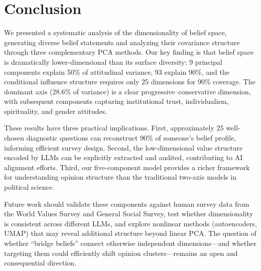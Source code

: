 \section{Conclusion}
\label{sec:conclusion}

We presented a systematic analysis of the dimensionality of belief space, generating \nbeliefs diverse belief statements and analyzing their covariance structure through three complementary PCA methods. Our key finding is that belief space is dramatically lower-dimensional than its surface diversity: 9 principal components explain 50\% of attitudinal variance, 93 explain 90\%, and the conditional influence structure requires only 25 dimensions for 90\% coverage. The dominant axis (28.6\% of variance) is a clear progressive--conservative dimension, with subsequent components capturing institutional trust, individualism, spirituality, and gender attitudes.

These results have three practical implications. First, approximately 25 well-chosen diagnostic questions can reconstruct 90\% of someone's belief profile, informing efficient survey design. Second, the low-dimensional value structure encoded by LLMs can be explicitly extracted and audited, contributing to AI alignment efforts. Third, our five-component model provides a richer framework for understanding opinion structure than the traditional two-axis models in political science.

Future work should validate these components against human survey data from the World Values Survey and General Social Survey, test whether dimensionality is consistent across different LLMs, and explore nonlinear methods (autoencoders, UMAP) that may reveal additional structure beyond linear PCA. The question of whether ``bridge beliefs'' connect otherwise independent dimensions---and whether targeting them could efficiently shift opinion clusters---remains an open and consequential direction.
